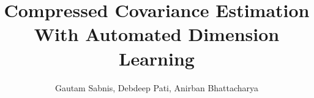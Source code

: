 \documentclass[11pt,oneside]{amsart}
\begin{document}



\title{Compressed Covariance Estimation With Automated Dimension Learning}
\author{Gautam Sabnis, Debdeep Pati, Anirban Bhattacharya}

\end{document}
